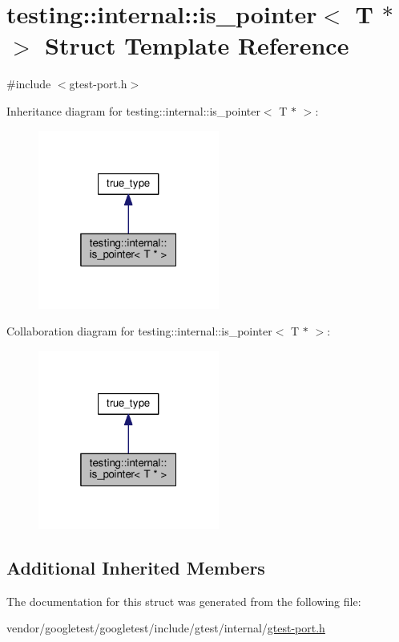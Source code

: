 \hypertarget{structtesting_1_1internal_1_1is__pointer_3_01T_01_5_01_4}{}\section{testing\+:\+:internal\+:\+:is\+\_\+pointer$<$ T $\ast$ $>$ Struct Template Reference}
\label{structtesting_1_1internal_1_1is__pointer_3_01T_01_5_01_4}


{\ttfamily \#include $<$gtest-\/port.\+h$>$}



Inheritance diagram for testing\+:\+:internal\+:\+:is\+\_\+pointer$<$ T $\ast$ $>$\+:
\nopagebreak
\begin{figure}[H]
\begin{center}
\leavevmode
\includegraphics[width=169pt]{structtesting_1_1internal_1_1is__pointer_3_01T_01_5_01_4__inherit__graph}
\end{center}
\end{figure}


Collaboration diagram for testing\+:\+:internal\+:\+:is\+\_\+pointer$<$ T $\ast$ $>$\+:
\nopagebreak
\begin{figure}[H]
\begin{center}
\leavevmode
\includegraphics[width=169pt]{structtesting_1_1internal_1_1is__pointer_3_01T_01_5_01_4__coll__graph}
\end{center}
\end{figure}
\subsection*{Additional Inherited Members}


The documentation for this struct was generated from the following file\+:\begin{DoxyCompactItemize}
\item 
vendor/googletest/googletest/include/gtest/internal/\hyperlink{gtest-port_8h}{gtest-\/port.\+h}\end{DoxyCompactItemize}
